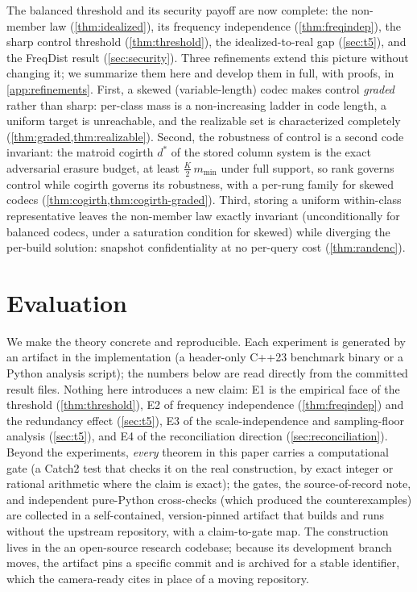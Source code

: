 \documentclass[sigconf,nonacm,anonymous,balance=false]{acmart}
\begin{document}
The balanced threshold and its security payoff are now complete: the non-member law
(\cref{thm:idealized}), its frequency independence (\cref{thm:freqindep}), the sharp
control threshold (\cref{thm:threshold}), the idealized-to-real gap (\cref{sec:t5}),
and the FreqDist result (\cref{sec:security}). Three refinements extend this picture
without changing it; we summarize them here and develop them in full, with proofs, in
\cref{app:refinements}. First, a skewed (variable-length) codec makes control
\emph{graded} rather than sharp: per-class mass is a non-increasing ladder in code
length, a uniform target is unreachable, and the realizable set is characterized
completely (\cref{thm:graded,thm:realizable}). Second, the robustness of control is a
second code invariant: the matroid cogirth $d^\ast$ of the stored column system is the
exact adversarial erasure budget, at least $\tfrac{K}{2}\,m_{\min}$ under full support,
so rank governs control while cogirth governs its robustness, with a per-rung family for
skewed codecs (\cref{thm:cogirth,thm:cogirth-graded}). Third, storing a uniform
within-class representative leaves the non-member law exactly invariant (unconditionally
for balanced codecs, under a saturation condition for skewed) while diverging the
per-build solution: snapshot confidentiality at no per-query cost (\cref{thm:randenc}).

\section{Evaluation}
\label{sec:experiments}

We make the theory concrete and reproducible. Each experiment is generated by an artifact
in the implementation (a header-only C++23 benchmark binary or a Python analysis script);
the numbers below are read directly from the committed result files. Nothing here
introduces a new claim: E1 is the empirical face of the threshold (\cref{thm:threshold}),
E2 of frequency independence (\cref{thm:freqindep}) and the redundancy effect
(\cref{sec:t5}), E3 of the scale-independence and sampling-floor analysis (\cref{sec:t5}),
and E4 of the reconciliation direction (\cref{sec:reconciliation}). Beyond the experiments,
\emph{every} theorem in this paper carries a computational gate (a Catch2 test that checks it
on the real construction, by exact integer or rational arithmetic where the claim is exact);
the gates, the source-of-record note, and independent pure-Python cross-checks (which produced
the counterexamples) are collected in a self-contained, version-pinned artifact that builds and
runs without the upstream repository, with a claim-to-gate map. The construction lives in the
an open-source research codebase; because its development branch moves, the artifact pins a
specific commit and is archived for a stable identifier, which the camera-ready cites in place
of a moving repository.
\end{document}
